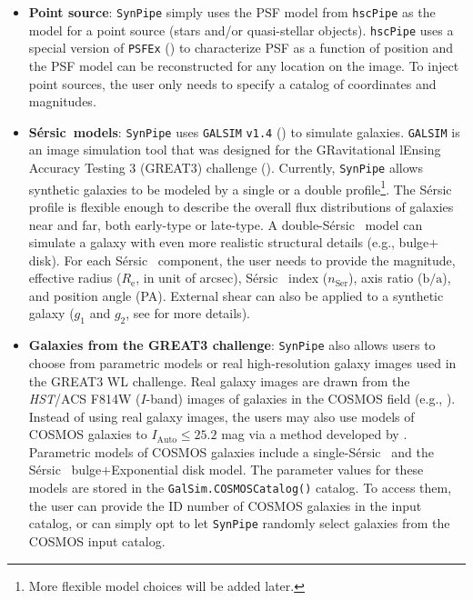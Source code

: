 \documentclass[useamsfonts]{pasj01}
\def\ser{{S\'{e}rsic\ }}
\def\hscpipe{\texttt{hscPipe}}
\def\synpipe{\texttt{SynPipe}}
\def\galsim{\texttt{G}{\scriptsize \texttt{AL}}\texttt{S}{\scriptsize \texttt{IM}}}
\def\hst{{\textit{HST}}}
\begin{document}
    \begin{itemize}

        \item \textbf{Point source}: 
            \synpipe{} simply uses the PSF model from \hscpipe{} as the model for
            a point source (stars and/or quasi-stellar objects).
            \hscpipe{} uses a special version of \texttt{PSFEx}
            (\citealt{Bertin2011, Bertin2013}) to characterize PSF as a function
            of position and the PSF model can be reconstructed for any location on 
            the image. 
            To inject point sources, the user only needs to specify a catalog of 
            coordinates and magnitudes.
            
        \item \textbf{\ser{}models}:
            \texttt{SynPipe} uses \galsim{} \texttt{v1.4} (\citealt{Rowe2015}) to
            simulate galaxies.
            \galsim{} is an image simulation tool that was designed for the 
            GRavitational lEnsing Accuracy Testing 3 (GREAT3) challenge
            (\citealt{Mandelbaum2014}). 
            Currently, \synpipe{} allows synthetic galaxies to be modeled by a
            single or a double \citet{Sersic1963}
            profile\footnote{More flexible model choices will be added later.}. 
            The \ser{} profile is flexible enough to describe the overall flux
            distributions of galaxies near and far, both early-type or late-type.
            A double-\ser{} model can simulate a galaxy with even more realistic
            structural details (e.g., bulge$+$disk).
            For each \ser{} component, the user needs to provide the magnitude,
            effective radius ($R_{\mathrm{e}}$, in unit of arcsec), \ser{} index
            ($n_{\mathrm{Ser}}$), axis ratio ($\mathrm{b}/\mathrm{a}$), and position
            angle (PA).
            External shear can also be applied to a synthetic galaxy ($g_1$ and
            $g_2$, see \citealt{Rowe2015} for more details).
            
        \item \textbf{Galaxies from the GREAT3 challenge}: 
            \synpipe{} also allows users to choose from parametric models or real
            high-resolution galaxy images used in the GREAT3 WL challenge. 
            Real galaxy images are drawn from the \hst{}/ACS F814W ($I$-band) images 
            of galaxies in the COSMOS field (e.g., \citealt{Scoville2007,Leauthaud2007}). 
            Instead of using real galaxy images, the users may also use models of COSMOS 
            galaxies to $I_{\mathrm{Auto}}\leq25.2$ mag via a method developed by
            \citet{Lackner2012}.  
            Parametric models of COSMOS galaxies include a single-\ser{} and the \ser{}
            bulge$+$Exponential disk model. 
            The parameter values for these models are stored in the
            \texttt{GalSim.COSMOSCatalog()} catalog.
            To access them, the user can provide the ID number of COSMOS galaxies
            in the input catalog, or can simply opt to let \synpipe{} randomly select 
            galaxies from the COSMOS input catalog.
            
    \end{itemize}
\end{document}
